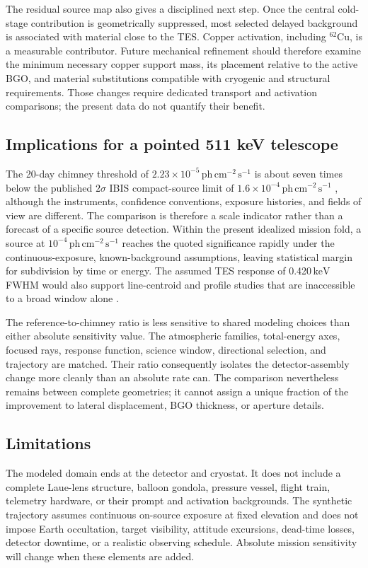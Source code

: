 \documentclass[11pt]{article}
\newcommand{\keV}{\ensuremath{\,\mathrm{keV}}\xspace}
\newcommand{\phflux}{\ensuremath{\,\mathrm{ph\,cm^{-2}\,s^{-1}}}\xspace}
\begin{document}
The residual source map also gives a disciplined next step. Once the central
cold-stage contribution is geometrically suppressed, most selected delayed
background is associated with material close to the TES. Copper activation,
including $^{62}$Cu, is a measurable contributor. Future mechanical refinement
should therefore examine the minimum necessary copper support mass, its
placement relative to the active BGO, and material substitutions compatible
with cryogenic and structural requirements. Those changes require dedicated
transport and activation comparisons; the present data do not quantify their
benefit.

\subsection{Implications for a pointed 511 keV telescope}

The 20-day chimney threshold of $2.23\times10^{-5}\phflux$ is about seven times
below the published $2\sigma$ IBIS compact-source limit of
$1.6\times10^{-4}\phflux$ \citep{DeCesare2011}, although the instruments,
confidence conventions, exposure histories, and fields of view are different.
The comparison is therefore a scale indicator rather than a forecast of a
specific source detection. Within the present idealized mission fold, a source
at $10^{-4}\phflux$ reaches the quoted significance rapidly under the
continuous-exposure, known-background assumptions, leaving statistical margin
for subdivision by time or energy. The assumed TES response of 0.420\keV FWHM
would also support line-centroid and profile studies that are inaccessible to a
broad window alone \citep{Jean2006,Siegert2016,Hu2026}.

The reference-to-chimney ratio is less sensitive to shared modeling choices
than either absolute sensitivity value. The atmospheric
families, total-energy axes, focused rays, response function, science window,
directional selection, and trajectory are matched. Their ratio consequently
isolates the detector-assembly change more cleanly than an absolute rate can.
The comparison nevertheless remains between complete geometries; it cannot
assign a unique fraction of the improvement to lateral displacement, BGO
thickness, or aperture details.

\subsection{Limitations}
\label{sec:limitations}

The modeled domain ends at the detector and cryostat. It does not include a
complete Laue-lens structure, balloon gondola, pressure vessel, flight train,
telemetry hardware, or their prompt and activation backgrounds. The synthetic
trajectory assumes continuous on-source exposure at fixed elevation and does
not impose Earth occultation, target visibility, attitude excursions,
dead-time losses, detector downtime, or a realistic observing schedule.
Absolute mission sensitivity will change when these elements are added.
\end{document}
